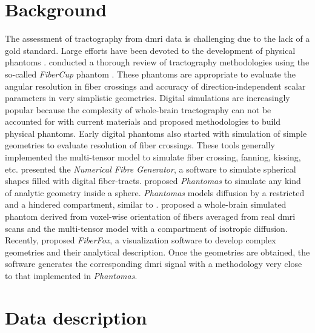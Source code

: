 \documentclass[english]{frontiers/frontiersSCNS} %
\begin{document}
\section*{Background}
The assessment of tractography from \gls*{dmri} data is challenging due to
  the lack of a gold standard.
Large efforts have been devoted to the development of physical phantoms
  \citep{lin_validation_2001,campbell_flowbased_2005,perrin_validation_2005,fieremans_simulation_2008,tournier_resolving_2008}.
\cite{cote_tractometer_2013} conducted a thorough review of tractography methodologies using the
  so-called \emph{FiberCup} phantom \citep{poupon_new_2008,fillard_quantitative_2011}.
These phantoms are appropriate to evaluate the angular resolution in fiber crossings and accuracy of
  direction-independent scalar parameters in very simplistic geometries.
Digital simulations are increasingly popular because the complexity of whole-brain tractography
  can not be accounted for with current materials and proposed methodologies to build physical phantoms.
Early digital phantoms also started with simulation of simple geometries
  \citep{basser_in_2000,goessl_fiber_2002,tournier_limitations_2002,leemans_mathematical_2005}
  to evaluate resolution of fiber crossings.
These tools generally implemented the multi-tensor model \citep{alexander_analysis_2001,tuch_high_2002}
  to simulate fiber crossing, fanning, kissing, etc.
\cite{close_software_2009} presented the \emph{Numerical Fibre Generator}, a software to simulate
  spherical shapes filled with digital fiber-tracts.
\cite{caruyer_phantomas_2014} proposed \emph{Phantomas} to simulate any kind of analytic geometry
  inside a sphere.
\emph{Phantomas} models diffusion by a restricted and a hindered compartment, similar to
  \citep{assaf_composite_2005}.
\cite{wilkins_fiber_2014} proposed a whole-brain simulated phantom derived from voxel-wise orientation
  of fibers averaged from real \gls*{dmri} scans and the multi-tensor model with a compartment of
  isotropic diffusion.
Recently, \cite{neher_fiberfox_2014} proposed \emph{FiberFox}, a visualization software to develop
  complex geometries and their analytical description.
Once the geometries are obtained, the software generates the corresponding \gls*{dmri} signal with a
  methodology very close to that implemented in \emph{Phantomas}.


\section*{Data description}
\end{document}
